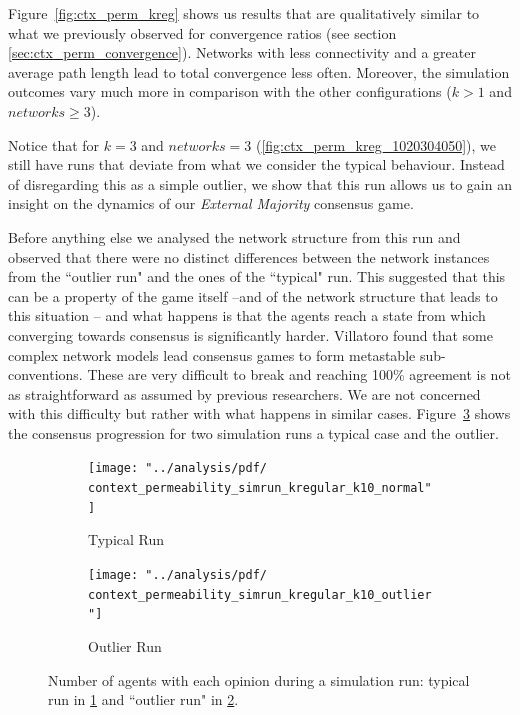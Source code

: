 \documentclass[preprint,number]{elsarticle}
\begin{document}
\noindent Figure~\ref{fig:ctx_perm_kreg} shows us results that are qualitatively similar to what we previously observed for convergence ratios (see section \ref{sec:ctx_perm_convergence}). Networks with less connectivity and a greater average path length lead to total convergence less often. Moreover, the simulation outcomes vary much more in comparison with the other configurations ($k>1$ and $networks \ge 3$).

Notice that for $k=3$ and $networks=3$ (\ref{fig:ctx_perm_kreg_1020304050}), we still have runs that deviate from what we consider the typical behaviour. Instead of disregarding this as a simple outlier, we show that this run allows us to gain an insight on the dynamics of our \textit{External Majority} consensus game.

Before anything else we analysed the network structure from this run and observed that there were no distinct differences between the network instances from the ``outlier run" and the ones of the ``typical" run. This suggested that this can be a property of the game itself --and of the network structure that leads to this situation -- and what happens is that the agents reach a state from which converging towards consensus is significantly harder. Villatoro \cite{Villatoro2013}  found that some complex network models lead consensus games to form metastable sub-conventions. These are very difficult to break and reaching 100\% agreement is not as straightforward as assumed by previous researchers. We are not concerned with this difficulty but rather with what happens in similar cases. Figure~\ref{fig:ctx_perm_kreg_runs} shows the consensus progression for two simulation runs a typical case and the outlier.

\begin{figure}[H]
	\centering
	\begin{subfigure}{.49\linewidth}
		\centering
		\texttt{[image: "../analysis/pdf/ context\_permeability\_simrun\_kregular\_k10\_normal"]}
		\caption{Typical Run}
		\label{fig:ctx_perm_kreg_run_normal}
	\end{subfigure}%
	\begin{subfigure}{.49\linewidth}
		\centering
		\texttt{[image: "../analysis/pdf/ context\_permeability\_simrun\_kregular\_k10\_outlier"]}
		\caption{Outlier Run}
		\label{fig:ctx_perm_kreg_run_outlier}
	\end{subfigure}
	
	\begin{minipage}{0.9\linewidth}
		\vspace{0.2cm}
		\caption{Number of agents with each opinion during a simulation run: typical run in \ref{fig:ctx_perm_kreg_run_normal} and ``outlier run" in \ref{fig:ctx_perm_kreg_run_outlier}.}
		\label{fig:ctx_perm_kreg_runs}
	\end{minipage}
\end{figure}
\end{document}
